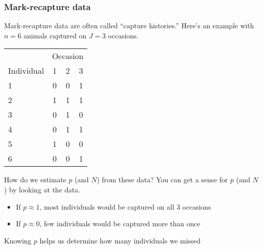 \documentclass[color=usenames,dvipsnames]{beamer}\usepackage[]{graphicx}\usepackage[]{color}
\begin{document}
\begin{frame}
  \frametitle{Mark-recapture data}
  \small
  Mark-recapture data are often called ``capture histories.'' Here's
  an example with $n=6$ animals captured on $J=3$ occasions. \\
  \centering
  \begin{tabular}{lccc}
    \hline
    & \multicolumn{3}{c}{Occasion} \\
    \cline{2-4}
    Individual & 1 & 2 & 3 \\
    \hline
    1 & 0 & 0 & 1 \\
    2 & 1 & 1 & 1 \\
    3 & 0 & 1 & 0 \\
    4 & 0 & 1 & 1 \\
    5 & 1 & 0 & 0 \\
    6 & 0 & 0 & 1 \\
    \hline
  \end{tabular}
  \pause
  \vfill
  \flushleft
  How do we estimate $p$ (and $N$) from these data? %
  \pause
  You can get a sense for $p$ (and $N$) by looking at the data.
  \begin{itemize}
    \setlength\itemsep{.1pt}
    \item If $p\approx 1$, most individuals would be captured
      on all 3 occasions
    \item If $p\approx 0$, few individuals would be captured 
      more than once
  \end{itemize}
  \pause
  \vfill
  Knowing $p$ helps us determine how many individuals we missed  
\end{frame}




\end{document}
